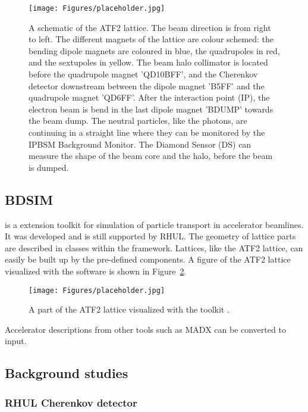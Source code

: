 \begin{figure}
\centering
\texttt{[image: Figures/placeholder.jpg]}%
\caption[ATF2]{A schematic of the ATF2 lattice. The beam direction is from right to left. The different magnets of the lattice are colour schemed: the bending dipole magnets are coloured in blue, the quadrupoles in red, and the sextupoles in yellow. The beam halo collimator is located before the quadrupole magnet 'QD10BFF', and the Cherenkov detector downstream between the dipole magnet 'B5FF' and the quadrupole magnet 'QD6FF'. After the interaction point (IP), the electron beam is bend in the last dipole magnet 'BDUMP' towards the beam dump. The neutral particles, like the photons, are continuing in a straight line where they can be monitored by the IPBSM Background Monitor. The Diamond Sensor (DS) can measure the shape of the beam core and the halo, before the beam is dumped.}
\label{fig:ATF2}
\end{figure}

\subsection{BDSIM}
\label{BDSIM}
\bdsim is a \geant extension toolkit for simulation of particle transport in accelerator beamlines. It was developed and is still supported by RHUL.
The geometry of lattice parts are described in classes within the \bdsim framework. Lattices, like the ATF2 lattice, can easily be built up by the pre-defined components. A figure of the ATF2 lattice visualized with the \bdsim software is shown in Figure~\ref{fig:ATF2_BDSIM}.
\begin{figure}
\centering
\texttt{[image: Figures/placeholder.jpg]}%
\caption[ATF2 lattice in \bdsim]{A part of the ATF2 lattice visualized with the \geant toolkit \bdsim.}
\label{fig:ATF2_BDSIM}
\end{figure}
Accelerator descriptions from other tools such as MADX can be converted to \bdsim input. 
\subsection{Background studies}
\subsubsection{RHUL Cherenkov detector}
\label{RHUL}

